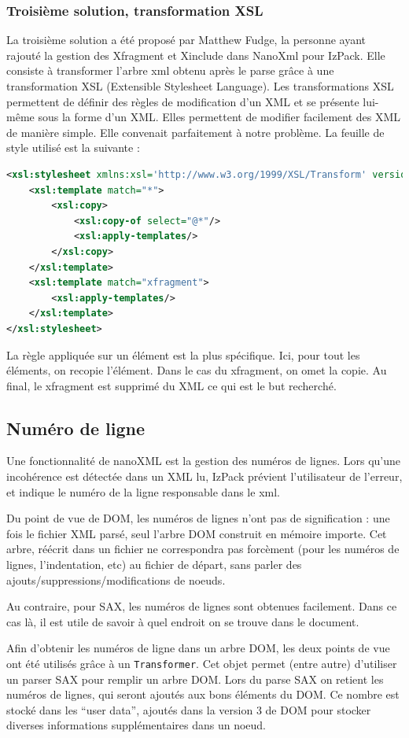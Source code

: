 \subsubsection{Troisième solution, transformation XSL}
La troisième solution a été proposé par Matthew Fudge, la personne ayant rajouté la gestion des Xfragment et Xinclude dans NanoXml pour IzPack.
Elle consiste à transformer l'arbre xml obtenu après le parse grâce à une transformation XSL (Extensible Stylesheet Language).
Les transformations XSL permettent de définir des règles de modification d'un XML et se présente lui-même sous la forme d'un XML.
Elles permettent de modifier facilement des XML de manière simple.
Elle convenait parfaitement à notre problème.
La feuille de style utilisé est la suivante :
\begin{lstlisting}[language=xml]
<xsl:stylesheet xmlns:xsl='http://www.w3.org/1999/XSL/Transform' version='1.0'>
    <xsl:template match="*">
        <xsl:copy>
            <xsl:copy-of select="@*"/>
            <xsl:apply-templates/>
        </xsl:copy>
    </xsl:template>
    <xsl:template match="xfragment">
        <xsl:apply-templates/>
    </xsl:template>
</xsl:stylesheet>
\end{lstlisting}
La règle appliquée sur un élément est la plus spécifique.
Ici, pour tout les éléments, on recopie l'élément.
Dans le cas du xfragment, on omet la copie.
Au final, le xfragment est supprimé du XML ce qui est le but recherché.
\subsection{Numéro de ligne}
Une fonctionnalité de nanoXML est la gestion des numéros de lignes. 
Lors qu'une incohérence est détectée dans un XML lu, IzPack prévient l'utilisateur de l'erreur, et indique le numéro de la ligne responsable dans le xml.

Du point de vue de DOM, les numéros de lignes n'ont pas de signification : une fois le fichier XML parsé, seul l'arbre DOM construit en mémoire importe. 
Cet arbre, réécrit dans un fichier ne correspondra pas forcèment (pour les numéros de lignes, l'indentation, etc) au fichier de départ, sans parler des ajouts/suppressions/modifications de noeuds.

Au contraire, pour SAX, les numéros de lignes sont obtenues facilement.
Dans ce cas là, il est utile de savoir à quel endroit on se trouve dans le document.

Afin d'obtenir les numéros de ligne dans un arbre DOM, les deux points de vue ont été utilisés grâce à un \verb|Transformer|.
Cet objet permet (entre autre) d'utiliser un parser SAX pour remplir un arbre DOM.
Lors du parse SAX on retient les numéros de lignes, qui seront ajoutés aux bons éléments du DOM.
Ce nombre est stocké dans les ``user data'', ajoutés dans la version 3  de DOM pour stocker diverses informations supplémentaires dans un noeud.

